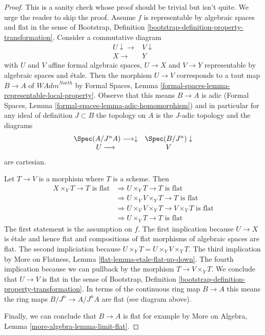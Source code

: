 \begin{proof}
This is a sanity check whose proof should be trivial but isn't quite.
We urge the reader to skip the proof.
Assume $f$ is representable by algebraic spaces and
flat in the sense of Bootstrap, Definition
\ref{bootstrap-definition-property-transformation}.
Consider a commutative diagram
$$
\begin{array}{cc}U \downarrow\longrightarrow & V \downarrow \\ X \longrightarrow & Y\end{array}
$$
with $U$ and $V$ affine formal algebraic spaces, $U \to X$ and $V \to Y$
representable by algebraic spaces and \'etale.
Then the morphism $U \to V$
corresponds to a taut map $B \to A$ of $\textit{WAdm}^{Noeth}$ by
Formal Spaces, Lemma
\ref{formal-spaces-lemma-representable-local-property}.
Observe that this means $B \to A$ is adic (Formal Spaces, Lemma
\ref{formal-spaces-lemma-adic-homomorphism})
and in particular for any ideal of definition $J \subset B$
the topology on $A$ is the $J$-adic topology and the diagrams
$$
\begin{array}{cc}\Spec(A/J^nA) \longrightarrow\downarrow & \Spec(B/J^n) \downarrow \\ U \longrightarrow & V\end{array}
$$
are cartesian.

\medskip\noindent
Let $T \to V$ is a morphism where $T$ is a scheme. Then
\begin{align*}
X \times_Y T \to T\text{ is flat}
& \Rightarrow
U \times_Y T \to T\text{ is flat} \\
& \Rightarrow
U \times_V V \times_Y T \to T\text{ is flat} \\
& \Rightarrow
U \times_V V \times_Y T \to V \times_Y T\text{ is flat} \\
& \Rightarrow
U \times_V T \to T\text{ is flat}
\end{align*}
The first statement is the assumption on $f$.
The first implication because $U \to X$ is \'etale and hence flat
and compositions of flat morphisms of algebraic spaces are flat.
The second impliciation because $U \times_Y T = U \times_V V \times_Y T$.
The third implication by
More on Flatness, Lemma \ref{flat-lemma-etale-flat-up-down}.
The fourth implication because we can pullback by the morphism
$T \to V \times_Y T$.
We conclude that $U \to V$ is flat in the sense of
Bootstrap, Definition
\ref{bootstrap-definition-property-transformation}.
In terms of the continuous ring map $B \to A$
this means the ring maps $B/J^n \to A/J^nA$ are flat (see diagram above).

\medskip\noindent
Finally, we can conclude that $B \to A$ is flat for example
by More on Algebra, Lemma \ref{more-algebra-lemma-limit-flat}.
\end{proof}

